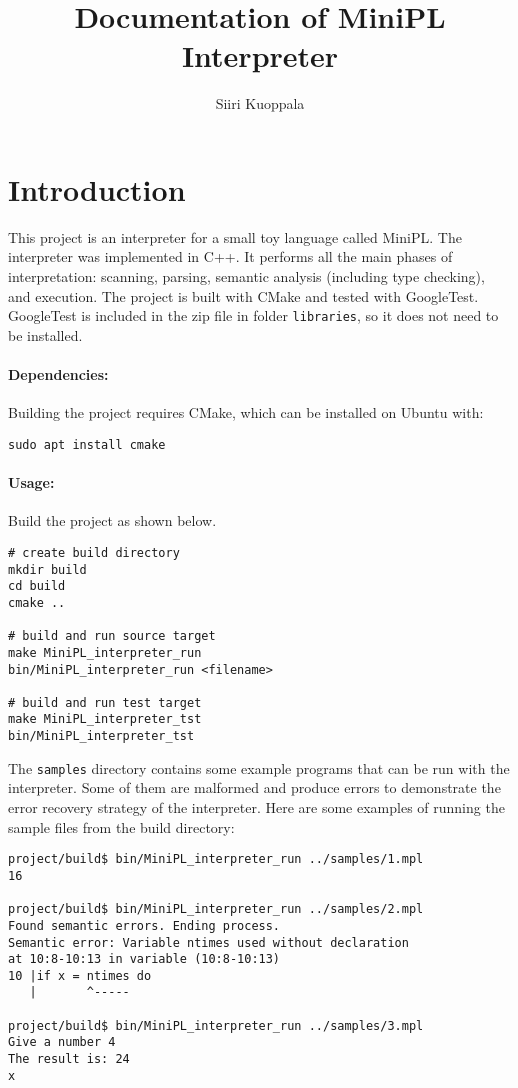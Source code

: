 \documentclass[a4paper]{article}
\newcommand*{\code}[1]{\texttt{#1}}
\begin{document}
\begin{titlepage}
  \title{Documentation of MiniPL Interpreter}
  \author{Siiri Kuoppala}
  \maketitle
  \tableofcontents
\end{titlepage}


\section{Introduction}
This project is an interpreter for a small toy language
called MiniPL. The interpreter was implemented in C++.
It performs all the main phases of interpretation: 
scanning, parsing, semantic analysis (including type checking), 
and execution. The project is built with CMake and tested 
with GoogleTest. GoogleTest is included in the zip file in 
folder \code{libraries}, so it does not need to be installed.

\paragraph*{Dependencies:} Building the project requires CMake, 
which can be installed on Ubuntu with: 
\begin{verbatim}
sudo apt install cmake
\end{verbatim}

\paragraph*{Usage:} Build the project as shown below.

\begin{verbatim}
# create build directory
mkdir build
cd build
cmake ..

# build and run source target
make MiniPL_interpreter_run
bin/MiniPL_interpreter_run <filename>

# build and run test target
make MiniPL_interpreter_tst
bin/MiniPL_interpreter_tst
\end{verbatim}

The \code{samples} directory contains some example programs 
that can be run with the interpreter. Some of them are malformed 
and produce errors to demonstrate the error recovery strategy 
of the interpreter. Here are some examples of running the sample 
files from the build directory: 
\begin{verbatim}
project/build$ bin/MiniPL_interpreter_run ../samples/1.mpl
16

project/build$ bin/MiniPL_interpreter_run ../samples/2.mpl
Found semantic errors. Ending process.
Semantic error: Variable ntimes used without declaration 
at 10:8-10:13 in variable (10:8-10:13)
10 |if x = ntimes do
   |       ^-----

project/build$ bin/MiniPL_interpreter_run ../samples/3.mpl
Give a number 4
The result is: 24
x\end{verbatim}
\end{document}
